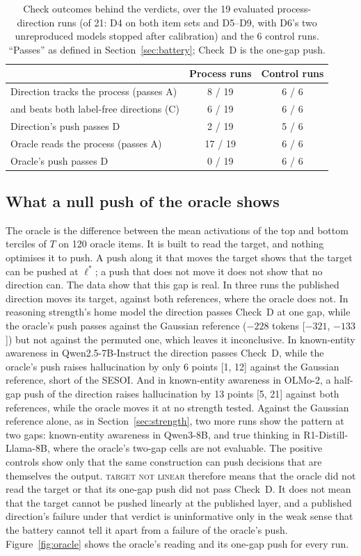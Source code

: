 \documentclass[11pt]{article}
\newcommand{\verdict}[1]{\textsc{\MakeLowercase{#1}}}
\begin{document}
\begin{table}[t]
\centering\small
\caption{Check outcomes behind the verdicts, over the 19 evaluated process-direction runs (of 21: D4 on both item sets and D5--D9, with D6's two unreproduced models stopped after calibration) and the 6 control runs. ``Passes'' as defined in Section~\ref{sec:battery}; Check~D is the one-gap push.}
\label{tab:checks}
\begin{tabular}{@{}l c c@{}}
\toprule
 & Process runs & Control runs \\
\midrule
Direction tracks the process (passes A) & 8 / 19 & 6 / 6 \\
\quad and beats both label-free directions (C) & 6 / 19 & 6 / 6 \\
Direction's push passes D & 2 / 19 & 5 / 6 \\
Oracle reads the process (passes A) & 17 / 19 & 6 / 6 \\
Oracle's push passes D & 0 / 19 & 6 / 6 \\
\bottomrule
\end{tabular}
\end{table}

\subsection{What a null push of the oracle shows}\label{sec:oracle}
The oracle is the difference between the mean activations of the top and bottom terciles of $T$ on 120 oracle items. It is built to read the target, and nothing optimises it to push. A push along it that moves the target shows that the target can be pushed at $\ell^*$; a push that does not move it does not show that no direction can. The data show that this gap is real. In three runs the published direction moves its target, against both references, where the oracle does not. In reasoning strength's home model the direction passes Check~D at one gap, while the oracle's push passes against the Gaussian reference ($-228$ tokens [$-321$, $-133$]) but not against the permuted one, which leaves it inconclusive. In known-entity awareness in Qwen2.5-7B-Instruct the direction passes Check~D, while the oracle's push raises hallucination by only 6 points [1, 12] against the Gaussian reference, short of the SESOI. And in known-entity awareness in OLMo-2, a half-gap push of the direction raises hallucination by 13 points [5, 21] against both references, while the oracle moves it at no strength tested. Against the Gaussian reference alone, as in Section~\ref{sec:strength}, two more runs show the pattern at two gaps: known-entity awareness in Qwen3-8B, and true thinking in R1-Distill-Llama-8B, where the oracle's two-gap cells are not evaluable. The positive controls show only that the same construction can push decisions that are themselves the output. \verdict{TARGET NOT LINEAR} therefore means that the oracle did not read the target or that its one-gap push did not pass Check~D. It does not mean that the target cannot be pushed linearly at the published layer, and a published direction's failure under that verdict is uninformative only in the weak sense that the battery cannot tell it apart from a failure of the oracle's push. Figure~\ref{fig:oracle} shows the oracle's reading and its one-gap push for every run.
\end{document}

